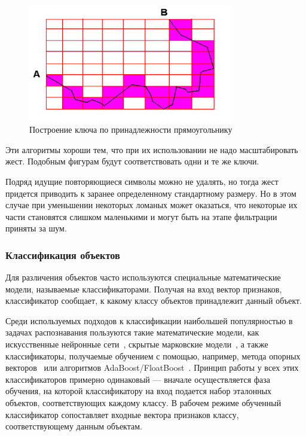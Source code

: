 \documentclass[a5paper]{article}
\begin{document}
\begin{figure} [ht]
  \begin{center}
    \includegraphics[width=0.8\textwidth, bb=0 0 544 390]{03-squares.png}
    \caption{Построение ключа по принадлежности прямоугольнику}
    \label{squares}
  \end{center}
\end{figure}

Эти алгоритмы хороши тем, что при их использовании не надо масштабировать жест. Подобным фигурам будут соответствовать одни и те же ключи.

Подряд идущие повторяющиеся символы можно не удалять, но тогда жест придется приводить к заранее определенному стандартному размеру. Но в этом случае при уменьшении некоторых ломаных может оказаться, что некоторые их части становятся слишком маленькими и
могут быть на этапе фильтрации приняты за шум.

\subsubsection{Классификация объектов}
Для различения объектов часто используются специальные математические модели, называемые классификаторами. Получая на вход вектор признаков, классификатор сообщает, к какому классу объектов принадлежит данный объект. 

Среди используемых подходов к классификации наибольшей популярностью в задачах распознавания пользуются такие математические модели, как искусственные нейронные сети~\cite{neuronet1, neuronet2, neuronet3}, скрытые марковские модели~\cite{hmm1, hmm2, hmm3}, а также классификаторы, получаемые обучением с помощью, например, метода опорных векторов~\cite{svm1, svm2} или алгоритмов AdaBoost/FloatBoost~\cite{boosting1, boosting2}. Принцип работы у всех этих классификаторов примерно одинаковый --- вначале осуществляется фаза обучения, на которой классификатору на вход подается набор эталонных объектов, соответствующих каждому классу. В рабочем режиме обученный классификатор сопоставляет входные вектора признаков классу, соответствующему данным объектам.
\end{document}
